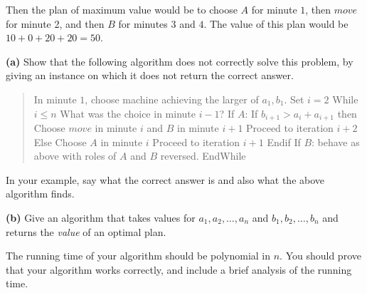 \documentclass[12pt]{article}
\begin{document}
\begin{enumerate}
Then the plan of maximum value would be to choose
$A$ for minute $1$, then $move$ for minute 2,
and then $B$ for minutes $3$ and $4$.
The value of this plan would be $10 + 0 + 20 + 20 = 50$.

\bigskip
\bigskip

{\bf (a)} Show that the following algorithm does not
correctly solve this problem, by giving an instance on which
it does not return the correct answer.
\begin{quote}
\begin{code}
In minute $1$, choose machine achieving the larger of $a_1, b_1$.
Set $i=2$
While $i \le n$
   What was the choice in minute $i-1$?
   If $A$:
      If $b_{i+1} > a_i + a_{i+1}$ then
         Choose $move$ in minute $i$ and $B$ in minute $i+1$
         Proceed to iteration $i+2$
      Else
         Choose $A$ in minute $i$
         Proceed to iteration $i+1$
      Endif
   If $B$: behave as above with roles of $A$ and $B$ reversed.
EndWhile
\end{code}
\end{quote}
In your example, say what the correct answer is and
also what the above algorithm finds.


{\bf (b)} 
Give an algorithm that takes values for
$a_1, a_2, \ldots, a_n$ and $b_1, b_2, \ldots, b_n$
and returns the {\em value} of an optimal plan.

The running time of your algorithm should be polynomial in $n$.
You should prove that your algorithm works correctly, and include a
brief analysis of the running time.

\end{enumerate}
\end{document}
